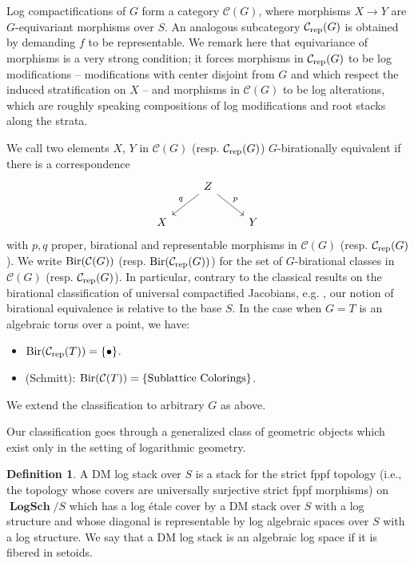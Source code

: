 \documentclass[11pt]{amsart}
\theoremstyle{definition}
\newtheorem{definition}[theorem]{Definition}
\theoremstyle{remark}
\DeclareMathOperator{\LogSch}{\mathbf{LogSch}}
\begin{document}
Log compactifications of $G$ form a category $\mathcal{C}(G)$, where morphisms
$X \to Y$ are $G$-equivariant morphisms over $S$. An analogous subcategory
$\mathcal{C}_{\textup{rep}}(G)$ is obtained by demanding $f$ to be
representable. We remark here that equivariance of morphisms is a very strong condition; it forces morphisms in $\mathcal{C}_{\textup{rep}}(G)$ to be log modifications -- modifications with center disjoint from $G$ and which respect the induced stratification on $X$ -- and morphisms in $\mathcal{C}(G)$ to be log alterations, which are roughly speaking compositions of log modifications and root stacks along the strata.

We call two elements $X$, $Y$ in $\mathcal{C}(G)$ (resp.
$\mathcal{C}_{\textup{rep}}(G)$) $G$-birationally equivalent if there is a correspondence
\[
\begin{tikzcd}
	& Z \ar[rd,"p"] \ar[ld, swap, "q"] & \\ X& &Y
\end{tikzcd}
\]
with $p,q$ proper, birational and representable morphisms in $\mathcal{C}(G)$
(resp. $\mathcal{C}_{\textup{rep}}(G)$). We write
$\textup{Bir}(\mathcal{C}(G))$ (resp. $\textup{Bir}(\mathcal{C}_{\textup{rep}}(G))$)
for the set of $G$-birational classes in $\mathcal{C}(G)$ (resp. $\mathcal{C}_{\textup{rep}}(G)$).
In particular, contrary to the classical
results on the birational classification of universal compactified Jacobians, e.g. \cite{farkas2011classificationuniversaljacobiansmoduli},
our notion of birational equivalence is relative to the base $S$. In the case when $G=T$ is an
algebraic torus over a point, we have:
\begin{itemize}
	\item $\textup{Bir}(\mathcal{C}_{\textup{rep}}(T))=\left\{\bullet \right\}$.
	\item (Schmitt): $\textup{Bir}(\mathcal{C}(T))=\{\textup{Sublattice Colorings}\}$.
\end{itemize}
We extend the classification to arbitrary $G$ as above.

Our classification goes through a generalized class of geometric objects
which exist only in the setting of logarithmic geometry.

\begin{definition}
	A DM log stack over $S$ is a stack for the strict fppf
	topology (i.e., the topology whose covers are universally surjective strict fppf morphisms)
	on $\LogSch/S$ which has a log étale cover by a DM stack over $S$
	with a log structure and whose diagonal is representable by log algebraic spaces
	over $S$ with a log structure. We say that a DM log stack is an
	algebraic log space if it is fibered in setoids.
\end{definition}
\end{document}
